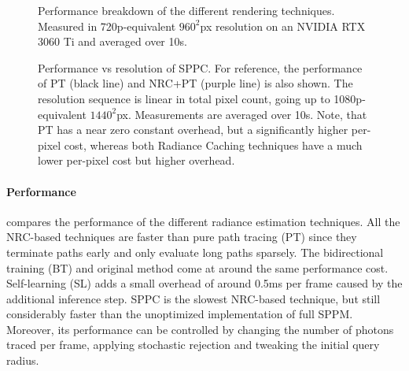 \begin{figure}[htb!]
    \centering
    
    \caption{Performance breakdown of the different rendering techniques. Measured in 720p-equivalent $960^2$px resolution on an NVIDIA RTX 3060 Ti and averaged over 10s.}
    \label{fig:breakdown}
\end{figure}

\begin{figure}[htb!]
    \centering
    
    \caption{Performance vs resolution of SPPC. For reference, the performance of PT (black line) and NRC+PT (purple line) is also shown. The resolution sequence is linear in total pixel count, going up to 1080p-equivalent $1440^2$px. Measurements are averaged over 10s. Note, that PT has a near zero constant overhead, but a significantly higher per-pixel cost, whereas both Radiance Caching techniques have a much lower per-pixel cost but higher overhead.}
    \label{fig:perres}
\end{figure}

\paragraph{Performance}  compares the performance of the different radiance estimation techniques.
All the NRC-based techniques are faster than pure path tracing (PT) since they terminate paths early and only evaluate long paths sparsely.
The bidirectional training (BT) and original method come at around the same performance cost.
Self-learning (SL) adds a small overhead of around 0.5ms per frame caused by the additional inference step.
SPPC is the slowest NRC-based technique, but still considerably faster than the unoptimized implementation of full SPPM.
Moreover, its performance can be controlled by changing the number of photons traced per frame, applying stochastic rejection and tweaking the initial query radius.